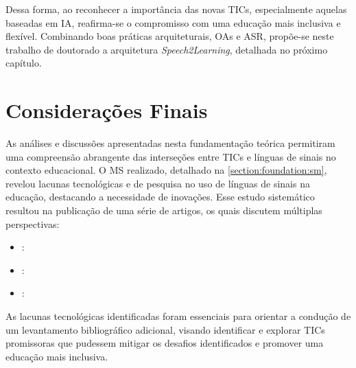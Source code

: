 Dessa forma, ao reconhecer a importância das novas TICs, especialmente aquelas baseadas em IA, reafirma-se o compromisso com uma educação mais inclusiva e flexível. Combinando boas práticas arquiteturais, OAs e ASR, propõe-se neste trabalho de doutorado a arquitetura \textit{Speech2Learning}, detalhada no próximo capítulo.

\section{Considerações Finais}

As análises e discussões apresentadas nesta fundamentação teórica permitiram uma compreensão abrangente das interseções entre TICs e línguas de sinais no contexto educacional. O MS realizado, detalhado na \autoref{section:foundation:sm}, revelou lacunas tecnológicas e de pesquisa no uso de línguas de sinais na educação, destacando a necessidade de inovações. Esse estudo sistemático resultou na publicação de uma série de artigos, os quais discutem múltiplas perspectivas:

\begin{itemize}
    \item {}: 

    \item {}: 

    \item {}: 
\end{itemize}

As lacunas tecnológicas identificadas foram essenciais para orientar a condução de um levantamento bibliográfico adicional, visando identificar e explorar TICs promissoras que pudessem mitigar os desafios identificados e promover uma educação mais inclusiva.

